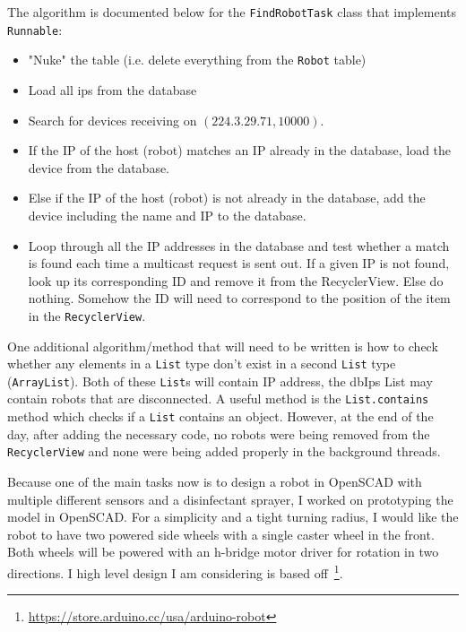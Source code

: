 \documentclass[fontsize=11pt, %
                             paper=a4, %
                             twoside, %
                             captions=tableheading,
                             index=totoc,
                             hyperref]{labbook}
\begin{document}
\begin{addmargin}[0cm]{0cm}
The algorithm is documented below for the \texttt{FindRobotTask} class that implements \texttt{Runnable}:
\begin{itemize}
\item "Nuke" the table (i.e. delete everything from the \texttt{Robot} table)
\item Load all ips from the database
\item Search for devices receiving on $(224.3.29.71, 10000)$.
\item If the IP of the host (robot) matches an IP already in the database, load the device from the database.
\item Else if the IP of the host (robot) is not already in the database, add the device including the name and IP to the database.
\item Loop through all the IP addresses in the database and test whether a match is found each time a multicast request is sent out. If a given IP is not found, look up its corresponding ID and remove it from the RecyclerView. Else do nothing. Somehow the ID will need to correspond to the position of the item in the \texttt{RecyclerView}.   
\end{itemize}
One additional algorithm/method that will need to be written is how to check whether any elements in a \texttt{List} type don't exist in a second \texttt{List} type (\texttt{ArrayList}). Both of these \texttt{List}s will contain IP address, the dbIps List may contain robots that are disconnected. A useful method is the \texttt{List.contains} method which checks if a \texttt{List} contains an object. However, at the end of the day, after adding the necessary code, no robots were being removed from the \texttt{RecyclerView} and none were being added properly in the background threads.

Because one of the main tasks now is to design a robot in OpenSCAD with multiple different sensors and a disinfectant sprayer, I worked on prototyping the model in OpenSCAD. For a simplicity and a tight turning radius, I would like the robot to have two powered side wheels with a single caster wheel in the front. Both wheels will be powered with an h-bridge motor driver for rotation in two directions. I high level design I am considering is based off~\footnote{\url{https://store.arduino.cc/usa/arduino-robot}}. 


\end{addmargin}
\end{document}

